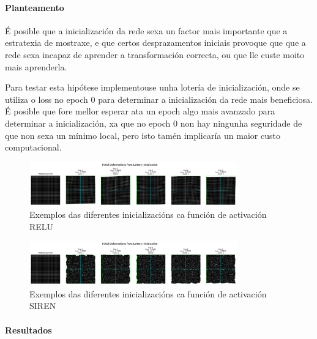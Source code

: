 \paragraph{Planteamento}
\label{par:Planteamento-initialization}

É posible que a inicialización da rede sexa un factor mais importante que a estratexia de mostraxe, e que certos desprazamentos iniciais provoque que que a rede sexa incapaz de aprender a transformación correcta, ou que lle custe moito mais aprenderla.

Para testar esta hipótese implementouse unha lotería de inicialización, onde se utiliza o loss no epoch 0 para determinar a inicialización da rede mais beneficiosa.
É posible que fore mellor esperar ata un epoch algo mais avanzado para determinar a inicialización, xa que no epoch 0 non hay ningunha seguridade de que non sexa un mínimo local, pero isto tamén implicaría un maior custo computacional.


\begin{figure}[ht]
    \centering
    \includegraphics[width=0.8\textwidth]{imaxes/lottery/initial_deformations_combinedMLP.png}
    \caption{Exemplos das diferentes inicializacións ca función de activación RELU}
    \label{fig:lottery_initial_deformations_combinedMLP}
\end{figure}

\begin{figure}[ht]
    \centering
    \includegraphics[width=0.8\textwidth]{imaxes/lottery/initial_deformations_combinedSIREN.png}
    \caption{Exemplos das diferentes inicializacións ca función de activación SIREN}
    \label{fig:lottery_initial_deformations_combinedSIREN}
\end{figure}

\FloatBarrier

\paragraph{Resultados}
\label{par:Resultados-initialization}


